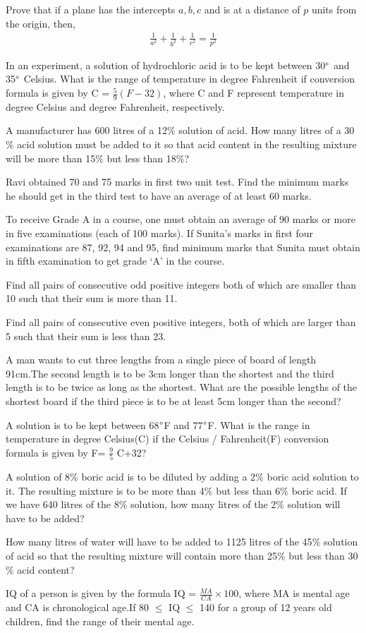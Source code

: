 %
\item Prove that if a plane has the intercepts $a, b, c$ and is at a distance of $p$ units from the origin, then, 
\begin{align}
\frac{1}{a^2}+\frac{1}{b^2}+\frac{1}{c^2}=\frac{1}{p^2} 
\end{align}
     \item In an experiment, a solution of hydrochloric acid is to be kept between 30$\degree$ and 35$\degree$ Celsius. What is the range of temperature in degree Fahrenheit if conversion formula is given by 
     C = $\frac{5}{9}(F-32)$, where C and F represent temperature in degree Celsius and degree Fahrenheit, respectively.
     \item A manufacturer has 600 litres of a 12$\%$ solution of acid. How many litres of a 30$\%$ acid solution must be added to it so that acid content in the resulting mixture will be more than 15$\%$ but less than 18$\%$?
    \item Ravi obtained 70 and 75 marks in first two unit test. Find the minimum marks he should get in the third test to have an average of at least 60 marks.
    \item To receive Grade A in a course, one must obtain an average of 90 marks or more in five examinations (each of 100 marks). If Sunita’s marks in first four examinations are 87, 92, 94 and 95, find minimum marks that Sunita must obtain in fifth examination to get grade ‘A’ in the course.
    \item Find all pairs of consecutive odd positive integers both of which are smaller than 10 such that their sum is more than 11.
    \item Find all pairs of consecutive even positive integers, both of which are larger than 5 such that their sum is less than 23.
    \item A man wants to cut three lengths from a single piece of board of length 91cm.The second length is to be 3cm longer than the shortest and the third length is to be twice as long as the shortest. What are the possible lengths of the shortest board if the third piece is to be at least 5cm longer than the second?
    \item A solution is to be kept between 68$\degree$F and 77$\degree$F. What is the range in temperature in degree Celsius(C) if the Celsius / Fahrenheit(F) conversion formula is given by
    F= $\frac{9}{5}$ C+32?
    \item A solution of 8$\%$ boric acid is to be diluted by adding a 2$\%$ boric acid solution to
it. The resulting mixture is to be more than 4$\%$ but less than 6$\%$ boric acid. If we have
640 litres of the 8$\%$ solution, how many litres of the 2$\%$ solution will have to be added?
    \item How many litres of water will have to be added to 1125 litres of the 45$\%$ solution
of acid so that the resulting mixture will contain more than 25$\%$ but less than 30$\%$ acid
content?
    \item IQ of a person is given by the formula
            IQ = $\frac{MA}{CA}\times 100$,
    where MA is mental age and CA is chronological age.If 80 $\leq$ IQ $\leq$ 140 for a group of
12 years old children, find the range of their mental age.
%
